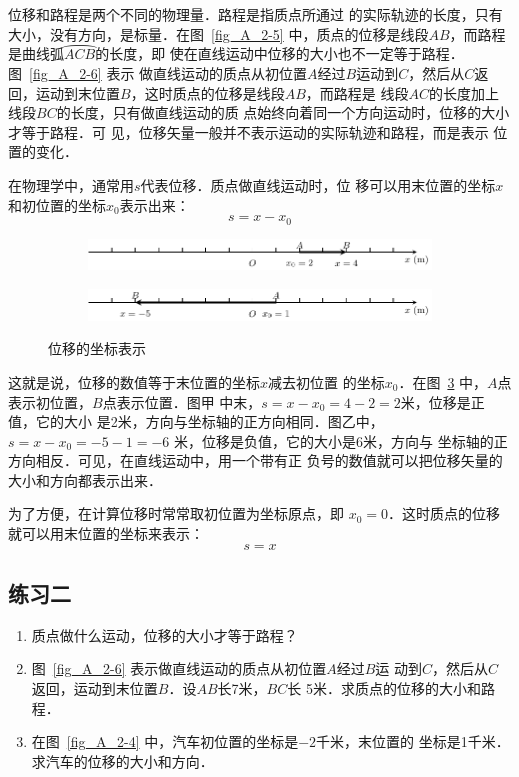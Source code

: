     位移和路程是两个不同的物理量．路程是指质点所通过
的实际轨迹的长度，只有大小，没有方向，是标量．在图~\ref{fig_A_2-5} 
中，质点的位移是线段$AB$，而路程是曲线弧$\wideparen{ACB}$的长度，即
使在直线运动中位移的大小也不一定等于路程．图~\ref{fig_A_2-6} 表示
做直线运动的质点从初位置$A$经过$B$运动到$C$，然后从$C$返
回，运动到末位置$B$，这时质点的位移是线段$AB$，而路程是
线段$AC$的长度加上线段$BC$的长度，只有做直线运动的质
点始终向着同一个方向运动时，位移的大小才等于路程．可
见，位移矢量一般并不表示运动的实际轨迹和路程，而是表示
位置的变化．

    在物理学中，通常用$s$代表位移．质点做直线运动时，位
移可以用末位置的坐标$x$和初位置的坐标$x_0$表示出来：
\[s=x-x_0\]
\begin{figure}[htp]
    \centering
    \begin{subfigure} {0.48\linewidth} 
		\centering
		\includegraphics{fig/A/2-7a.pdf} 
		\caption{}\label{fig_A_2-7a} 
	\end{subfigure} 
	\hfill 
    \begin{subfigure} {0.48\linewidth} 
        \centering
        \includegraphics{fig/A/2-7b.pdf} 
        \caption{}\label{fig_A_2-7b} 
    \end{subfigure} 
    \caption{位移的坐标表示}\label{fig_A_2-7}
\end{figure}

这就是说，位移的数值等于末位置的坐标$x$减去初位置
的坐标$x_0$．在图~\ref{fig_A_2-7} 中，$A$点表示初位置，$B$点表示位置．图甲
中末，$s=x-x_0=4-2=2$米，位移是正值，它的大小
是2米，方向与坐标轴的正方向相同．图乙中，$s=x-x_0=-5-1=-6$
米，位移是负值，它的大小是6米，方向与
坐标轴的正方向相反．可见，在直线运动中，用一个带有正
负号的数值就可以把位移矢量的大小和方向都表示出来．

    为了方便，在计算位移时常常取初位置为坐标原点，即
$x_0=0$．这时质点的位移就可以用末位置的坐标来表示：
\[s=x\]

\subsection*{练习二}
\begin{enumerate}
  \item   质点做什么运动，位移的大小才等于路程？
  \item  图~\ref{fig_A_2-6} 表示做直线运动的质点从初位置$A$经过$B$运
  动到$C$，然后从$C$返回，运动到末位置$B$．设$AB$长7米，$BC$长
  5米．求质点的位移的大小和路程．
  \item 在图~\ref{fig_A_2-4} 中，汽车初位置的坐标是$-2$千米，末位置的
  坐标是1千米．求汽车的位移的大小和方向．
  
\end{enumerate}



